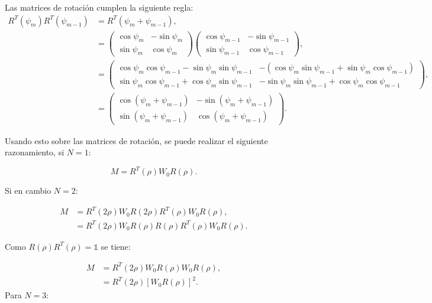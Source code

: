 Las matrices de rotación cumplen la siguiente regla:
\begin{align*}
R^T(\psi_m)R^T(\psi_{m-1}) &= R^T\left(\psi_m+\psi_{m-1}\right),\\
&=
\begin{pmatrix}
  \cos{\psi_m}&  -\sin{\psi_m}\\  \sin{\psi_m}&  \cos{\psi_m}
\end{pmatrix}
\begin{pmatrix}
  \cos{\psi_{m-1}}&  -\sin{\psi_{m-1}}\\  \sin{\psi_{m-1}}&  \cos{\psi_{m-1}}
\end{pmatrix},\\
&=
\begin{pmatrix}
  \cos{\psi_m}\cos{\psi_{m-1}}-\sin{\psi_m}\sin{\psi_{m-1}}&  
-(\cos{\psi_m}\sin{\psi_{m-1}}+\sin{\psi_m} \cos{\psi_{m-1}})\\
  \sin{\psi_m} \cos{\psi_{m-1}}+\cos{\psi_m}\sin{\psi_{m-1}}& 
 -\sin{\psi_m}\sin{\psi_{m-1}}+\cos{\psi_m}\cos{\psi_{m-1}}
\end{pmatrix},  \\
&=\begin{pmatrix}
  \cos{\left(\psi_m+\psi_{m-1}\right)}&  -\sin{\left(\psi_m+\psi_{m-1}\right)}\\
  \sin{\left(\psi_m+\psi_{m-1}\right)}&  \cos{\left(\psi_m+\psi_{m-1}\right)} 
\end{pmatrix}.
\end{align*}

Usando esto sobre las matrices de rotación, se puede realizar el
siguiente razonamiento, si $N=1$:

\begin{equation*}
  M = R^T(\rho)W_0R(\rho).
\end{equation*}

Si en cambio $N=2$:

\begin{align*}
  M &= R^T(2\rho)W_0R(2\rho)R^T(\rho)W_0R(\rho),\\
      &=R^T(2\rho)W_0R(\rho)R(\rho)R^T(\rho)W_0R(\rho).
\end{align*}

Como $R(\rho)R^T(\rho)=\mathds{1}$ se tiene:

\begin{align*}
 M &= R^T(2\rho)W_0R(\rho)W_0R(\rho),\\
     &=R^T(2\rho)\left[W_0R(\rho)\right]^2.
\end{align*}
Para $N=3$:

